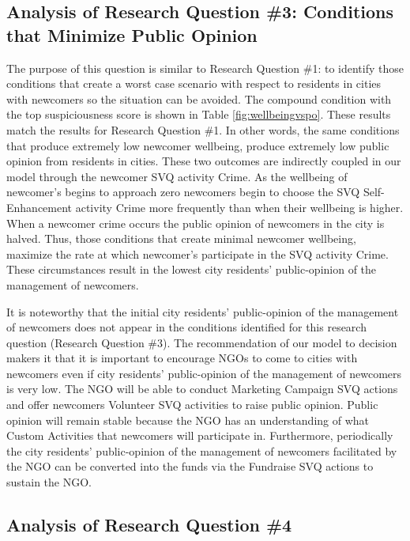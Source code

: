 \documentclass{scspaperproc}
\theoremstyle{scsthe}
\begin{document}
\subsection{Analysis of Research Question \#3: Conditions that Minimize Public Opinion}
The purpose of this question is similar to Research Question \#1: to identify those conditions that create a worst case scenario with respect to residents in cities with newcomers so the situation can be avoided. The compound condition with the top suspiciousness score is shown in Table \ref{fig:wellbeingvspo}. These results match the results for Research Question \#1. In other words, the same conditions that produce extremely low newcomer wellbeing, produce extremely low public opinion from residents in cities. These two outcomes are indirectly coupled in our model through the newcomer SVQ activity Crime. As the wellbeing of newcomer's begins to approach zero newcomers begin to choose the SVQ Self-Enhancement activity Crime more frequently than when their wellbeing is higher.  When a newcomer crime occurs the public opinion of newcomers in the city is halved. Thus, those conditions that create minimal newcomer wellbeing, maximize the rate at which newcomer's participate in the SVQ activity Crime. These circumstances result in the lowest city residents' public-opinion of the management of newcomers. 

It is noteworthy that the initial city residents' public-opinion of the management of newcomers does not appear in the conditions identified for this research question (Research Question \#3). The recommendation of our model to decision makers it that it is important to encourage NGOs to come to cities with newcomers even if city residents' public-opinion of the management of newcomers is very low. The NGO will be able to conduct Marketing Campaign SVQ actions and offer newcomers Volunteer SVQ activities to raise public opinion. Public opinion will remain stable because the NGO has an understanding of what Custom Activities that newcomers will participate in. Furthermore, periodically the city residents' public-opinion of the management of newcomers facilitated by the NGO can be converted into the funds via the Fundraise SVQ actions to sustain the NGO.

\subsection{Analysis of Research Question \#4}
\label{sec:rq4}
\end{document}
